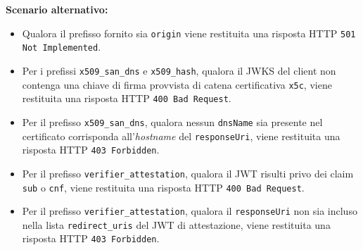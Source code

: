 \noindent\textbf{Scenario alternativo:}
\begin{itemize}
    \item Qualora il prefisso fornito sia \texttt{origin} viene restituita una risposta HTTP \texttt{501 Not Implemented}.
    \item Per i prefissi \texttt{x509\_\allowbreak{}san\_\allowbreak{}dns} e \texttt{x509\_\allowbreak{}hash}, qualora il JWKS del client non contenga una chiave di firma provvista di catena certificativa \texttt{x5c}, viene restituita una risposta HTTP \texttt{400 Bad Request}.
    \item Per il prefisso \texttt{x509\_\allowbreak{}san\_\allowbreak{}dns}, qualora nessun \texttt{dnsName} sia presente nel certificato corrisponda all'\textit{hostname} del \texttt{responseUri}, viene restituita una risposta HTTP \texttt{403 Forbidden}.
    \item Per il prefisso \texttt{verifier\_\allowbreak{}attestation}, qualora il JWT risulti privo dei claim \texttt{sub} o \texttt{cnf}, viene restituita una risposta HTTP \texttt{400 Bad Request}.
    \item Per il prefisso \texttt{verifier\_\allowbreak{}attestation}, qualora il \texttt{responseUri} non sia incluso nella lista \texttt{redirect\_\allowbreak{}uris} del JWT di attestazione, viene restituita una risposta HTTP \texttt{403 Forbidden}.
\end{itemize}

